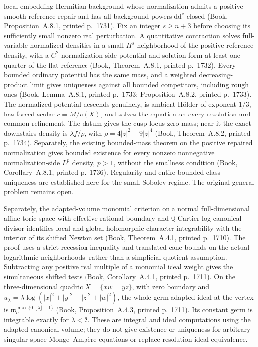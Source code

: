 \documentclass[11pt]{article}
\begin{document}
local-embedding Hermitian background whose normalization admits a positive smooth reference repair and has all background powers $\mathrm{dd}^{\mathrm c}$-closed (Book, Proposition~A.8.1, printed p.~1731). Fix an integer $s\geq n+3$ before choosing its sufficiently small nonzero real perturbation. A quantitative contraction solves full-variable normalized densities in a small $H^s$ neighborhood of the positive reference density, with a $C^2$ normalization-side potential and solution form at least one quarter of the flat reference (Book, Theorem~A.8.1, printed p.~1732). Every bounded ordinary potential has the same mass, and a weighted decreasing-product limit gives uniqueness against all bounded competitors, including rough ones (Book, Lemma~A.8.1, printed p.~1733; Proposition~A.8.2, printed p.~1733). The normalized potential descends genuinely, is ambient H\"older of exponent $1/3$, has forced scalar $c=M/\nu(X)$, and solves the equation on every resolution and common refinement. The datum gives the cusp locus zero mass; near it the exact downstairs density is $\lambda f/\rho$, with $\rho=4|z|^2+9|z|^4$ (Book, Theorem~A.8.2, printed p.~1734). Separately, the existing bounded-mass theorem on the positive repaired normalization gives bounded existence for every nonzero nonnegative normalization-side $L^p$ density, $p>1$, without the smallness condition (Book, Corollary~A.8.1, printed p.~1736). Regularity and entire bounded-class uniqueness are established here for the small Sobolev regime. The original general problem remains open.\par Separately, the adapted-volume monomial criterion on a normal full-dimensional affine toric space with effective rational boundary and $\mathbb Q$-Cartier log canonical divisor identifies local and global holomorphic-character integrability with the interior of its shifted Newton set (Book, Theorem~A.4.1, printed p.~1710). The proof uses a strict recession inequality and translated-cone bounds on the actual logarithmic neighborhoods, rather than a simplicial quotient assumption. Subtracting any positive real multiple of a monomial ideal weight gives the simultaneous shifted tests (Book, Corollary~A.4.1, printed p.~1711). On the three-dimensional quadric $X=\{xw=yz\}$, with zero boundary and $u_\lambda=\lambda\log(|x|^2+|y|^2+|z|^2+|w|^2)$, the whole-germ adapted ideal at the vertex is $\mathfrak m_o^{\max\{0,\lfloor\lambda\rfloor-1\}}$ (Book, Proposition~A.4.3, printed p.~1711). Its constant germ is integrable exactly for $\lambda<2$. These are integral and ideal computations using the adapted canonical volume; they do not give existence or uniqueness for arbitrary singular-space Monge--Amp\`ere equations or replace resolution-ideal equivalence.
\end{document}
